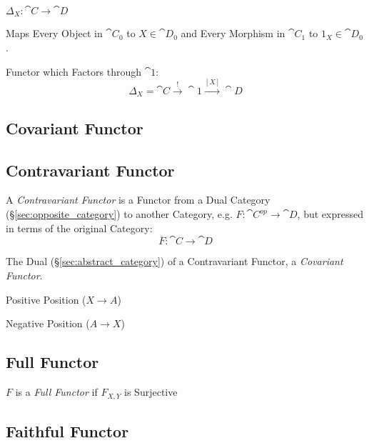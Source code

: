 $\Delta_X : \cat{C} \rightarrow \cat{D}$

Maps Every Object in $\cat{C}_0$ to $X \in \cat{D}_0$ and Every
Morphism in $\cat{C}_1$ to $1_X \in \cat{D}_0$.

Functor which Factors through $\cat{1}$:
\[
  \Delta_X = \cat{C} \xrightarrow{\;\;!\;\;} \cat{1}
    \xrightarrow{[X]} \cat{D}
\]



\subsection{Covariant Functor} \label{sec:covariant_functor}

\subsection{Contravariant Functor} \label{sec:contravariant_functor}

A \emph{Contravariant Functor} is a Functor from a Dual Category
(\S\ref{sec:opposite_category}) to another Category, e.g. $F :
\cat{C^{op}} \rightarrow \cat{D}$, but expressed in terms of the
original Category:
\[
  \overline{F} : \cat{C} \rightarrow \cat{D}
\]

The Dual (\S\ref{sec:abstract_category}) of a Contravariant
Functor, a \emph{Covariant Functor}.

Positive Position ($X \rightarrow A$)

Negative Position ($A \rightarrow X$)



\subsection{Full Functor}\label{sec:full_functor}

$F$ is a \emph{Full Functor} if $F_{X,Y}$ is Surjective



\subsection{Faithful Functor}\label{sec:faithful_functor}

